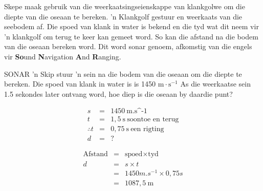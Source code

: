 \begin{minipage}{.5\textwidth}
\begin{figure}[H]
\begin{center}
\end{center}
\end{figure}       
\end{minipage}
\begin{minipage}{.5\textwidth}
Skepe maak gebruik van die weerkaatsingseienskappe van klankgolwe om die diepte van die oseaan te bereken.  'n Klankgolf gestuur en weerkaats van die seebodem af. Die spoed van klank in water is bekend en die tyd wat dit neem vir  'n klankgolf om terug te keer kan gemeet word. So kan die afstand na die bodem van die oseaan bereken word. Dit word sonar genoem, afkomstig van die engels vir \textbf{So}und \textbf{N}avigation \textbf{A}nd \textbf{R}anging.\par    
 \end{minipage}
            

\begin{wex}{SONAR}{ 'n Skip stuur  'n sein na die bodem van die oseaan om die diepte te bereken. Die spoed van klank in water is is 1450 $\text{m}\cdot\text{s}^{-1}$ As die weerkaatse sein 1.5 sekondes later ontvang word, hoe diep is die oseaan by daardie punt?}{
\begin{eqnarray*}
s &=& 1450 \ \text{m.s^{-1}}\\
t &=& 1,5 \ \text{s} \ \text{soontoe \ en \ terug}\\
\therefore t &= & 0,75 \ \text{s} \ \text{een \ rigting}\\
d &=& ?
\end{eqnarray*}

\begin{eqnarray*}
\text{Afstand} &=& \text{spoed} \times \text{tyd} \\
d &=& s \times t \\
&=& 1450 m.s^{-1} \times 0,75 s \\
&=& 1087,5 \ \text{m}
\end{eqnarray*}
}\end{wex}
          
